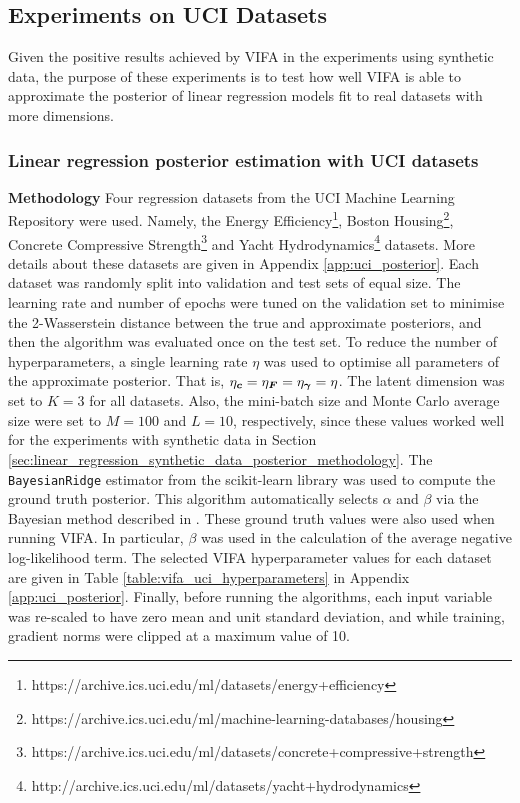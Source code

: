 \documentclass[10pt]{article} %
\newcommand{\vgamma}{\bm{\gamma}}
\begin{document}
\subsection{Experiments on UCI Datasets}
Given the positive results achieved by VIFA in the experiments using synthetic data, the purpose of these experiments is to test how well VIFA is able to approximate the posterior of linear regression models fit to real datasets with more dimensions.

\subsubsection{Linear regression posterior estimation with UCI datasets}
\label{sec:vifa_posterior_uci}
\textbf{Methodology}  Four regression datasets from the UCI Machine Learning Repository \citep{dua2019} were used. Namely, the Energy Efficiency\footnote{https://archive.ics.uci.edu/ml/datasets/energy+efficiency}, Boston Housing\footnote{https://archive.ics.uci.edu/ml/machine-learning-databases/housing}, Concrete Compressive Strength\footnote{https://archive.ics.uci.edu/ml/datasets/concrete+compressive+strength} and Yacht Hydrodynamics\footnote{http://archive.ics.uci.edu/ml/datasets/yacht+hydrodynamics} datasets. More details about these datasets are given in Appendix \ref{app:uci_posterior}.  Each dataset was randomly split into validation and test sets of equal size. The learning rate and number of epochs were tuned on the validation set to minimise the 2-Wasserstein distance between the true and approximate posteriors, and then the algorithm was evaluated once on the test set. To reduce the number of hyperparameters, a single learning rate $\eta$ was used to optimise all parameters of the approximate posterior. That is, $\eta_\vc = \eta_\mF = \eta_{\vgamma} = \eta$. The latent dimension was set to $K=3$ for all datasets. Also, the mini-batch size and Monte Carlo average size were set to $M=100$ and $L=10$, respectively, since these values worked well for the experiments with synthetic data in Section \ref{sec:linear_regression_synthetic_data_posterior_methodology}. The \texttt{BayesianRidge} estimator from the scikit-learn library \citep{pedregosa2012} was used to compute the ground truth posterior. This algorithm automatically selects $\alpha$ and $\beta$ via the Bayesian method described in \citep{mackay1992}. These ground truth values were also used when running VIFA. In particular, $\beta$ was used in the calculation of the average negative log-likelihood term. The selected VIFA hyperparameter values for each dataset are given in Table \ref{table:vifa_uci_hyperparameters} in Appendix \ref{app:uci_posterior}. Finally, before running the algorithms, each input variable was re-scaled to have zero mean and unit standard deviation, and while training, gradient norms were clipped at a maximum value of 10. 
\end{document}
